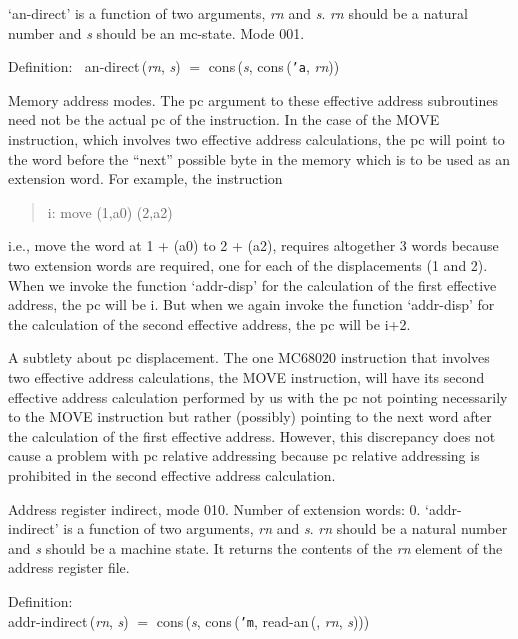  `an-direct' is a function of two arguments, {\it{rn\/}} and {\it{s\/}}.  {\it{rn\/}} should be
 a natural number and {\it{s\/}} should be an mc-state.  Mode 001.
\begin{tabbing}{\sc Definition}:$\;\;$
{\rm{an-direct}}\,({\it{rn\/}}, {\it{s\/}}) $=$ {\rm{cons}}\,({\it{s\/}}, {\rm{cons}}\,({\tt{'}}{\tt{a}}, {\it{rn\/}}))
\end{tabbing}

 Memory address modes.
 The pc argument to these effective address subroutines need not be
 the actual pc of the instruction.  In the case of the MOVE instruction,
 which involves two effective address calculations, the pc will point
 to the word before the ``next'' possible byte in the
 memory which is to be used as an extension word.  For example, the
 instruction
   \begin{quotation}i:    move (1,a0) (2,a2)\end{quotation}
 i.e., move the word at 1 + (a0) to 2 + (a2), requires altogether 3
 words because two extension words are required, one for each of the
 displacements (1 and 2).  When we invoke the function `addr-disp' for
 the calculation of the first effective address, the pc will be i.
 But when we again invoke the function `addr-disp' for the calculation
 of the second effective address, the pc will be i+2.

 A subtlety about pc displacement.  The one MC68020 instruction that
 involves two effective address calculations, the MOVE instruction,
 will have its second effective address calculation performed by us
 with the pc not pointing necessarily to the MOVE instruction but
 rather (possibly) pointing to the next word after the calculation
 of the first effective address.  However, this discrepancy does not
 cause a problem with pc relative addressing because pc relative
 addressing is prohibited in the second effective address calculation.

 \bigskip

 Address register indirect, mode 010.
 Number of extension words: 0.
 `addr-indirect' is a function of two arguments, {\it{rn\/}} and {\it{s\/}}.  {\it{rn\/}} should
 be a natural number and {\it{s\/}} should be a machine state.  It returns the
 contents of the {\it{rn\/}} element of the address register file.
\begin{tabbing}{\sc Definition}: \\  
{\rm{addr-indirect}}\,({\it{rn\/}}, {\it{s\/}}) $=$ {\rm{cons}}\,({\it{s\/}}, {\rm{cons}}\,({\tt{'}}{\tt{m}}, {\rm{read-an}}\,({}, {\it{rn\/}}, {\it{s\/}})))
\end{tabbing}


